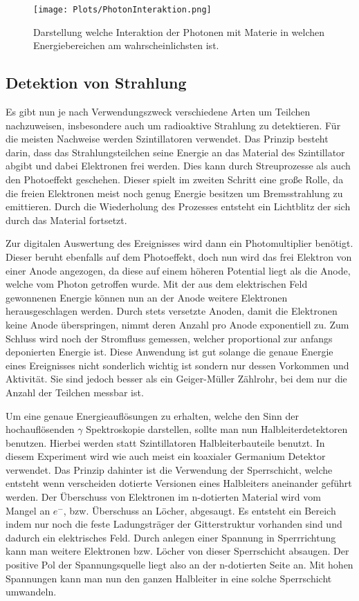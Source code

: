 \documentclass[]{article}
\begin{document}
\begin{figure}[H]
\centering
\texttt{[image: Plots/PhotonInteraktion.png]}
\caption{Darstellung welche Interaktion der Photonen mit Materie in welchen Energiebereichen am wahrscheinlichsten ist. }
\end{figure}

\subsection{Detektion von Strahlung}
Es gibt nun je nach Verwendungszweck verschiedene Arten um Teilchen nachzuweisen, insbesondere auch um radioaktive Strahlung zu detektieren. Für die meisten Nachweise werden Szintillatoren verwendet. Das Prinzip besteht darin, dass das Strahlungsteilchen seine Energie an das Material des Szintillator abgibt und dabei Elektronen frei werden. Dies kann durch Streuprozesse als auch den Photoeffekt geschehen. Dieser spielt im zweiten Schritt eine große Rolle, da die freien Elektronen meist noch genug Energie besitzen um Bremsstrahlung zu emittieren. Durch die Wiederholung des Prozesses entsteht ein Lichtblitz der sich durch das Material fortsetzt. 

Zur digitalen Auswertung des Ereignisses wird dann ein Photomultiplier benötigt. Dieser beruht ebenfalls auf dem Photoeffekt, doch nun wird das frei Elektron von einer Anode angezogen, da diese auf einem höheren Potential liegt als die Anode, welche vom Photon getroffen wurde. Mit der aus dem elektrischen Feld gewonnenen Energie können nun an der Anode weitere Elektronen herausgeschlagen werden. Durch stets versetzte Anoden, damit die Elektronen keine Anode überspringen, nimmt deren Anzahl pro Anode exponentiell zu. Zum Schluss wird noch der Stromfluss gemessen, welcher proportional zur anfangs deponierten Energie ist. Diese Anwendung ist gut solange die genaue Energie eines Ereignisses nicht sonderlich wichtig ist sondern nur dessen Vorkommen und Aktivität. Sie sind jedoch besser als ein Geiger-Müller Zählrohr, bei dem nur die Anzahl der Teilchen messbar ist.

Um eine genaue Energieauflösungen zu erhalten, welche den Sinn der hochauflösenden $\gamma$ Spektroskopie darstellen, sollte man nun Halbleiterdetektoren benutzen. Hierbei 
werden statt Szintillatoren Halbleiterbauteile benutzt. In diesem Experiment wird wie auch meist ein koaxialer Germanium Detektor verwendet. Das Prinzip dahinter ist die Verwendung der Sperrschicht, welche entsteht wenn verscheiden dotierte Versionen eines Halbleiters aneinander geführt werden. Der Überschuss von Elektronen im n-dotierten Material wird vom Mangel an $e^-$, bzw. Überschuss an Löcher, abgesaugt. Es entsteht ein Bereich indem nur noch die feste Ladungsträger der Gitterstruktur vorhanden sind und dadurch ein elektrisches Feld. Durch anlegen einer Spannung in Sperrrichtung kann man weitere Elektronen bzw. Löcher von dieser Sperrschicht absaugen. Der positive Pol der Spannungsquelle liegt also an der n-dotierten Seite an. Mit hohen Spannungen kann man nun den ganzen Halbleiter in eine solche Sperrschicht umwandeln.
\end{document}
